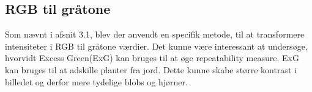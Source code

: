 \subsection{RGB til gråtone}
Som nævnt i afsnit 3.1, blev der anvendt en specifik metode, til at transformere intensiteter i RGB til gråtone værdier. Det kunne være interessant at undersøge, hvorvidt Excess Green(ExG) kan bruges til at øge repeatability measure. ExG kan bruges til at adskille planter fra jord\cite{exg}. Dette kunne skabe større kontrast i billedet og derfor mere tydelige blobs og hjørner. 